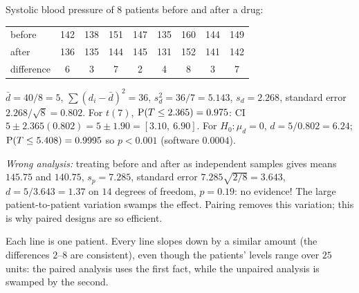 \begin{example}
Systolic blood pressure of $8$ patients before and after a drug:
\begin{center}
\begin{tabular}{l*{8}{c}}
\toprule
before & 142 & 138 & 151 & 147 & 135 & 160 & 144 & 149\\
after & 136 & 135 & 144 & 145 & 131 & 152 & 141 & 142\\
difference & 6 & 3 & 7 & 2 & 4 & 8 & 3 & 7\\
\bottomrule
\end{tabular}
\end{center}
$\bar d = 40/8 = 5$, $\sum(d_i-\bar d)^2 = 36$, $s_d^2 = 36/7 = 5.143$, $s_d = 2.268$,
standard error $2.268/\sqrt8 = 0.802$. For $t(7)$, $\operatorname{P}(T\le2.365)=0.975$:
CI $5\pm2.365(0.802) = 5\pm1.90 = [3.10,\ 6.90]$. For $H_0:\mu_d=0$, $d=5/0.802 = 6.24$;
$\operatorname{P}(T\le 5.408) = 0.9995$ so $p<0.001$ (software $0.0004$).

\emph{Wrong analysis:} treating before and after as independent samples gives means $145.75$
and $140.75$, $s_p = 7.285$, standard error $7.285\sqrt{2/8} = 3.643$, $d = 5/3.643 = 1.37$
on $14$ degrees of freedom, $p = 0.19$: no evidence! The large patient-to-patient
variation swamps the effect. Pairing removes this variation; this is why paired designs
are so efficient.
\end{example}

\begin{center}
\end{center}
Each line is one patient. Every line slopes down by a similar amount (the differences
$2$--$8$ are consistent), even though the patients' levels range over $25$ units: the
paired analysis uses the first fact, while the unpaired analysis is swamped by the second.


